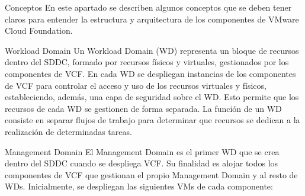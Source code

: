 \begin{section}{Conceptos}
En este apartado se describen algunos conceptos que se deben tener claros para entender la estructura y arquitectura de los componentes de VMware Cloud Foundation.



\begin{subsection}{Workload Domain}
Un Workload Domain (WD) representa un bloque de recursos dentro del SDDC, formado por recursos físicos y virtuales, gestionados por los componentes de VCF. En cada WD se despliegan instancias de los componentes de VCF para controlar el acceso y uso de los recursos virtuales y físicos, estableciendo, además, una capa de seguridad sobre el WD. Esto permite que los recursos de cada WD se gestionen de forma separada. La función de un WD consiste en separar flujos de trabajo para determinar que recursos se dedican a la realización de determinadas tareas.

\begin{subsubsection}{Management Domain}
\label{subsubsec:domainManagement}
El Management Domain es el primer WD que se crea dentro del SDDC cuando se despliega VCF. Su finalidad es alojar todos los componentes de VCF que gestionan el propio Management Domain y al resto de WDs. Inicialmente, se despliegan las siguientes VMs de cada componente:


\end{subsubsection}
\end{subsection}
\end{section}

